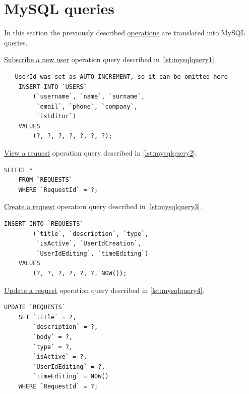 \documentclass[12pt, a4paper]{report}
\begin{document}
\section*{MySQL queries}

In this section the previously described \hyperref[subsec:ops]{operations} are translated into MySQL queries.

\hyperref[subsubsec:op1]{Subscribe a new user} operation query described in \autoref{lst:mysqlquery1}.

\begin{lstlisting}[language=MySQL, caption={\texorpdfstring{\hyperref[subsubsec:op1]{op. 1}}{op. 1}}, label={lst:mysqlquery1}]
    -- UserId was set as AUTO_INCREMENT, so it can be omitted here
    INSERT INTO `USERS`
        (`username`, `name`, `surname`,
         `email`, `phone`, `company`,
         `isEditor`)
    VALUES
        (?, ?, ?, ?, ?, ?, ?);
\end{lstlisting}

\hyperref[subsubsec:op2]{View a request} operation query described in \autoref{lst:mysqlquery2}.

\begin{lstlisting}[language=MySQL, caption={\texorpdfstring{\hyperref[subsubsec:op2]{op. 2}}{op. 2}}, label={lst:mysqlquery2}]
    SELECT *
    FROM `REQUESTS`
    WHERE `RequestId` = ?;
\end{lstlisting}

\hyperref[subsubsec:op3]{Create a request} operation query described in \autoref{lst:mysqlquery3}.

\begin{lstlisting}[language=MySQL, caption={\texorpdfstring{\hyperref[subsubsec:op3]{op. 3}}{op. 3}}, label={lst:mysqlquery3}]
    INSERT INTO `REQUESTS`
        (`title`, `description`, `type`,
         `isActive`, `UserIdCreation`,
         `UserIdEditing`, `timeEditing`)
    VALUES
        (?, ?, ?, ?, ?, ?, NOW());
\end{lstlisting}

\hyperref[subsubsec:op4]{Update a request} operation query described in \autoref{lst:mysqlquery4}.

\begin{lstlisting}[language=MySQL, caption={\texorpdfstring{\hyperref[subsubsec:op4]{op. 4}}{op. 4}}, label={lst:mysqlquery4}]
    UPDATE `REQUESTS`
    SET `title` = ?,
        `description` = ?,
        `body` = ?,
        `type` = ?,
        `isActive` = ?,
        `UserIdEditing` = ?,
        `timeEditing` = NOW()
    WHERE `RequestId` = ?;
\end{lstlisting}
\end{document}
